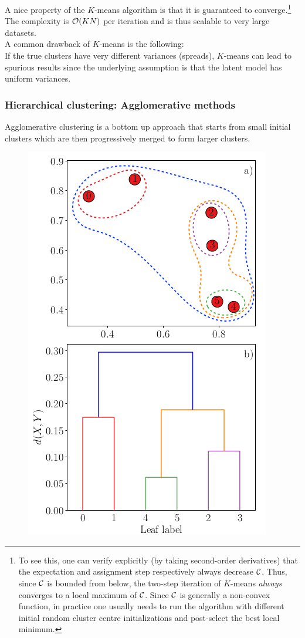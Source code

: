 A nice property of the $K$-means algorithm is that it is guaranteed to converge.\footnote{To see this, one can verify explicitly (by taking second-order derivatives) that the expectation and assignment step respectively always decrease $\mathcal{C}$. Thus, since $\mathcal{C}$ is bounded from below, the two-step iteration of $K$-means \emph{always} converges to a local maximum of $\mathcal{C}$. Since $\mathcal{C}$ is generally a non-convex function, in practice one usually needs to run the algorithm with different initial random cluster centre initializations and post-select the best local minimum.} The complexity is $\mathcal{O}(KN)$ per iteration and is thus scalable to very large datasets.\\
A common drawback of $K$-means is the following:\\
If the true clusters have very different variances (spreads), $K$-means can lead to spurious results since the underlying assumption is that the latent model has uniform variances.

\subsubsection{Hierarchical clustering: Agglomerative methods}
\label{subsubsec:ClusterPracticalHierarchical}
Agglomerative clustering is a bottom up approach that starts from small initial clusters which are then progressively merged to form larger clusters.
\begin{figure}[h!]
	\centering
	\includegraphics[width=0.4\linewidth]{gfx/HierarchicalCLustering}
	\caption{}
	\label{fig:hierarchicalclustering}
\end{figure}





















